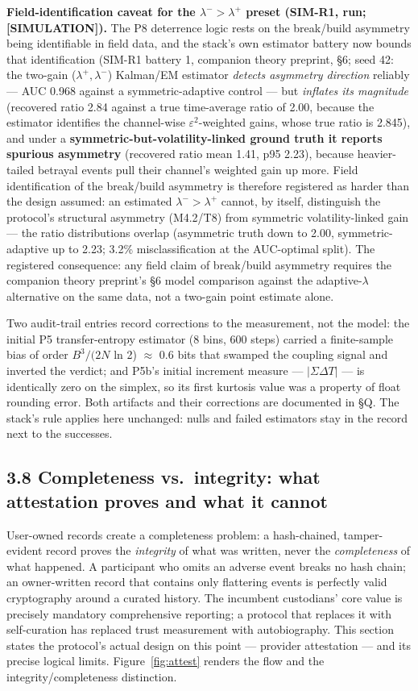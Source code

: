 \documentclass[11pt,twocolumn]{article}
\begin{document}
\textbf{Field-identification caveat for the \(\lambda^{-} > \lambda^{+}\) preset (SIM-R1, run; [SIMULATION]).} The P8 deterrence logic rests on the break/build asymmetry being identifiable in field data, and the stack's own estimator battery now bounds that identification (SIM-R1 battery 1, companion theory preprint, \S6; seed 42: the two-gain (\(\lambda^{+}, \lambda^{-}\)) Kalman/EM estimator \emph{detects asymmetry direction} reliably --- AUC 0.968 against a symmetric-adaptive control --- but \emph{inflates its magnitude} (recovered ratio 2.84 against a true time-average ratio of 2.00, because the estimator identifies the channel-wise \(\varepsilon^{2}\)-weighted gains, whose true ratio is 2.845), and under a \textbf{symmetric-but-volatility-linked ground truth it reports spurious asymmetry} (recovered ratio mean 1.41, p95 2.23), because heavier-tailed betrayal events pull their channel's weighted gain up more. Field identification of the break/build asymmetry is therefore registered as harder than the design assumed: an estimated \(\lambda^{-} > \lambda^{+}\) cannot, by itself, distinguish the protocol's structural asymmetry (M4.2/T8) from symmetric volatility-linked gain --- the ratio distributions overlap (asymmetric truth down to 2.00, symmetric-adaptive up to 2.23; 3.2\% misclassification at the AUC-optimal split). The registered consequence: any field claim of break/build asymmetry requires the companion theory preprint's \S6 model comparison against the adaptive-\(\lambda\) alternative on the same data, not a two-gain point estimate alone.

Two audit-trail entries record corrections to the measurement, not the
model: the initial P5 transfer-entropy estimator (8 bins, 600 steps) carried a
finite-sample bias of order \(B^{3}/(2N\) ln 2) \(\approx\) 0.6 bits
that swamped the coupling signal and inverted the verdict; and P5b's
initial increment measure --- \(|\Sigma \Delta T|\) --- is identically
zero on the simplex, so its first kurtosis value was a property of float
rounding error. Both artifacts and their corrections are documented in §Q. The stack's rule applies here unchanged: nulls and
failed estimators stay in the record next to the successes.

\subsection*{3.8 Completeness vs.~integrity: what attestation proves and
what it
cannot}

User-owned records create a completeness problem: a hash-chained,
tamper-evident record proves the
\emph{integrity} of what was written, never the \emph{completeness} of
what happened. A participant who omits an adverse event breaks no hash
chain; an owner-written record that contains only flattering events is
perfectly valid cryptography around a curated history. The incumbent
custodians' core value is precisely mandatory comprehensive reporting; a
protocol that replaces it with self-curation has replaced trust
measurement with autobiography. This section states the protocol's
actual design on this point --- provider attestation --- and its precise
logical limits. Figure~\ref{fig:attest} renders the flow and the
integrity/completeness distinction.
\end{document}
